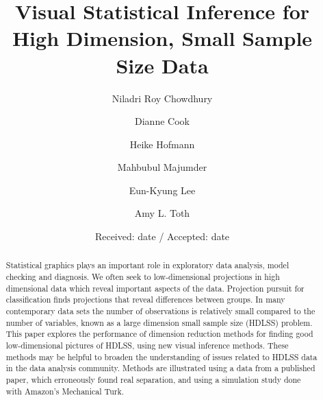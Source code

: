 \title{Visual Statistical Inference for High Dimension, Small Sample Size Data}\label{ch:largepsmalln}
\vspace{-0.8cm}
\author{Niladri Roy Chowdhury \and 
Dianne Cook \and
Heike Hofmann \and
Mahbubul Majumder \and
Eun-Kyung Lee \and
Amy L. Toth}


\date{Received: date / Accepted: date}

\maketitle

\begin{abstract}
Statistical graphics plays an important role in exploratory data analysis, model checking and diagnosis. We often seek to low-dimensional projections in high dimensional data which reveal important aspects of the data. Projection pursuit for classification finds projections that reveal differences between groups. In many contemporary data sets the number of observations is relatively small compared to the number of variables, known as a large dimension small sample size (HDLSS) problem. This paper explores the performance of dimension reduction methods for finding good low-dimensional pictures of HDLSS, using new visual inference methods. These methods may be helpful to broaden the understanding of issues related to HDLSS data in the data analysis community. Methods are illustrated using a data from a published paper, which erroneously found real separation, and using a simulation study done with Amazon's Mechanical Turk.

\end{abstract}

